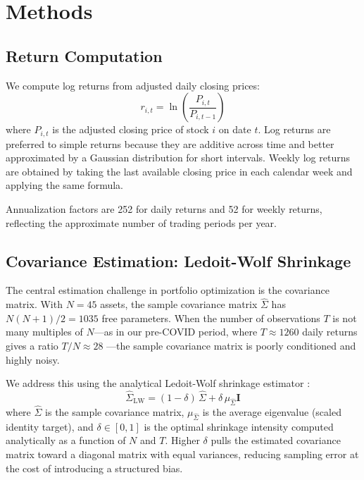 \documentclass[12pt,a4paper]{article}
\begin{document}
\section{Methods}
\label{sec:methods}

\subsection{Return Computation}

We compute log returns from adjusted daily closing prices:
\begin{equation}
    r_{i,t} = \ln\!\left(\frac{P_{i,t}}{P_{i,t-1}}\right)
\end{equation}
where $P_{i,t}$ is the adjusted closing price of stock $i$ on date $t$. Log returns
are preferred to simple returns because they are additive across time and better
approximated by a Gaussian distribution for short intervals. Weekly log returns are
obtained by taking the last available closing price in each calendar week and applying
the same formula.

Annualization factors are 252 for daily returns and 52 for weekly returns, reflecting
the approximate number of trading periods per year.

\subsection{Covariance Estimation: Ledoit-Wolf Shrinkage}

The central estimation challenge in portfolio optimization is the covariance matrix.
With $N = 45$ assets, the sample covariance matrix $\hat{\Sigma}$ has $N(N+1)/2 = 1035$
free parameters. When the number of observations $T$ is not many multiples of $N$---as
in our pre-COVID period, where $T \approx 1260$ daily returns gives a ratio $T/N \approx 28$
---the sample covariance matrix is poorly conditioned and highly noisy.

We address this using the analytical Ledoit-Wolf shrinkage estimator
\citep{LedoitWolf2004}:
\begin{equation}
    \hat{\Sigma}_{\text{LW}} = (1 - \delta)\,\hat{\Sigma} + \delta\,\mu_{\hat{\Sigma}} \mathbf{I}
\end{equation}
where $\hat{\Sigma}$ is the sample covariance matrix, $\mu_{\hat{\Sigma}}$ is the
average eigenvalue (scaled identity target), and $\delta \in [0,1]$ is the optimal
shrinkage intensity computed analytically as a function of $N$ and $T$. Higher $\delta$
pulls the estimated covariance matrix toward a diagonal matrix with equal variances,
reducing sampling error at the cost of introducing a structured bias.
\end{document}
